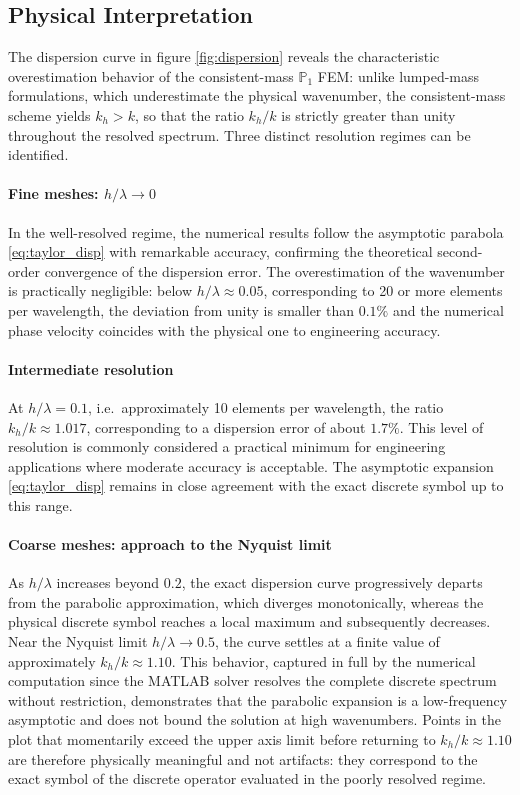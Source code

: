 \subsection{Physical Interpretation}

The dispersion curve in figure \ref{fig:dispersion} reveals the characteristic overestimation behavior of the consistent-mass \(\mathbb{P}_1\) FEM: unlike lumped-mass formulations, which underestimate the physical wavenumber, the consistent-mass scheme yields \(k_h > k\), so that the ratio \(k_h/k\) is strictly greater than unity throughout the resolved spectrum. Three distinct resolution regimes can be identified.

\paragraph{Fine meshes: \(h/\lambda \to 0\)} In the well-resolved regime, the numerical results follow the asymptotic parabola \eqref{eq:taylor_disp} with remarkable accuracy, confirming the theoretical second-order convergence of the dispersion error. The overestimation of the wavenumber is practically negligible: below \(h/\lambda \approx 0.05\), corresponding to 20 or more elements per wavelength, the deviation from unity is smaller than \(0.1\%\) and the numerical phase velocity coincides with the physical one to engineering accuracy.

\paragraph{Intermediate resolution} At \(h/\lambda = 0.1\), i.e.\ approximately 10 elements per wavelength, the ratio \(k_h/k \approx 1.017\), corresponding to a dispersion error of about \(1.7\%\). This level of resolution is commonly considered a practical minimum for engineering applications where moderate accuracy is acceptable. The asymptotic expansion \eqref{eq:taylor_disp} remains in close agreement with the exact discrete symbol up to this range.

\paragraph{Coarse meshes: approach to the Nyquist limit} As \(h/\lambda\) increases beyond \(0.2\), the exact dispersion curve progressively departs from the parabolic approximation, which diverges monotonically, whereas the physical discrete symbol reaches a local maximum and subsequently decreases. Near the Nyquist limit \(h/\lambda \to 0.5\), the curve settles at a finite value of approximately \(k_h/k \approx 1.10\). This behavior, captured in full by the numerical computation since the MATLAB solver resolves the complete discrete spectrum without restriction, demonstrates that the parabolic expansion is a low-frequency asymptotic and does not bound the solution at high wavenumbers. Points in the plot that momentarily exceed the upper axis limit before returning to \(k_h/k \approx 1.10\) are therefore physically meaningful and not artifacts: they correspond to the exact symbol of the discrete operator evaluated in the poorly resolved regime.

